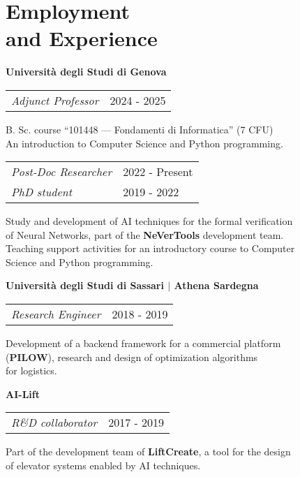 \section{\sc Employment \\and Experience}

{\bf{Universit\`a degli Studi di Genova}}\\
\begin{tabular}{@{}p{4in}p{2in}}
	\textit{Adjunct Professor} & 2024 - 2025\\
\end{tabular}

\begin{list1}	
	\item[] B. Sc. course ``101448 --- Fondamenti di Informatica'' (7 CFU)\\
	An introduction to Computer Science and Python programming.
\end{list1}

\begin{tabular}{@{}p{4in}p{2in}}
	\textit{Post-Doc Researcher} & 2022 - Present\\
	\textit{PhD student} & 2019 - 2022\\
\end{tabular}

\begin{list1}
	\item[] Study and development of AI techniques for the formal verification\\
	of Neural Networks, part of the \textbf{NeVerTools} development team.\\
	Teaching support activities for an introductory course to Computer\\
	Science and Python programming.
\end{list1}


{\bf{Universit\`a degli Studi di Sassari $\vert$ Athena Sardegna}}\\
\begin{tabular}{@{}p{4in}p{2in}}
	\textit{Research Engineer} & 2018 - 2019\\
\end{tabular}

\begin{list1}
	\item[] Development of a backend framework for a commercial platform\\
	(\textbf{PILOW}), research and design of optimization algorithms\\
	for logistics.
\end{list1}


{\bf{AI-Lift}}\\
\begin{tabular}{@{}p{4in}p{2in}}
	\textit{R\&D collaborator}  & 2017 - 2019\\
\end{tabular}

\begin{list1}
	\item[] Part of the development team of \textbf{LiftCreate}, a tool for the design\\
	of elevator systems enabled by AI techniques.
\end{list1}

